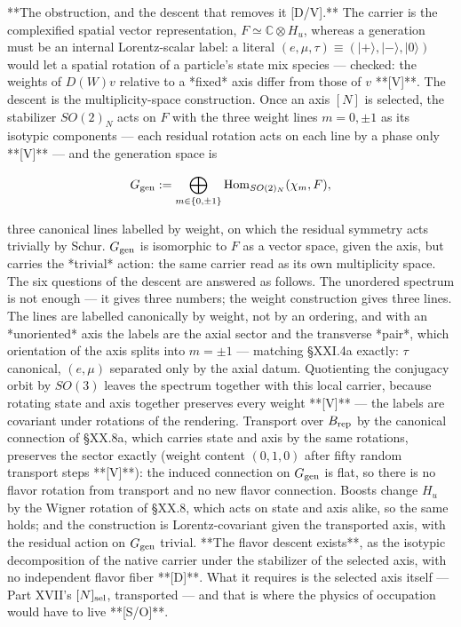 **The obstruction, and the descent that removes it [D/V].** The carrier is the complexified spatial vector representation, $F\simeq\mathbb C\otimes H_u$, whereas a generation must be an internal Lorentz-scalar label: a literal $(e,\mu,\tau)\equiv(|+\rangle,|-\rangle,|0\rangle)$ would let a spatial rotation of a particle's state mix species — checked: the weights of $D(W)v$ relative to a *fixed* axis differ from those of $v$ **[V]**. The descent is the multiplicity-space construction. Once an axis $[N]$ is selected, the stabilizer $SO(2)_N$ acts on $F$ with the three weight lines $m = 0,\pm1$ as its isotypic components — each residual rotation acts on each line by a phase only **[V]** — and the generation space is

$$G_{\rm gen} := \bigoplus_{m\in\{0,\pm1\} }{\rm Hom}_{SO(2)_N}(\chi_m,F),$$

three canonical lines labelled by weight, on which the residual symmetry acts trivially by Schur. $G_{\rm gen}$ is isomorphic to $F$ as a vector space, given the axis, but carries the *trivial* action: the same carrier read as its own multiplicity space. The six questions of the descent are answered as follows. The unordered spectrum is not enough — it gives three numbers; the weight construction gives three lines. The lines are labelled canonically by weight, not by an ordering, and with an *unoriented* axis the labels are the axial sector and the transverse *pair*, which orientation of the axis splits into $m = \pm1$ — matching §XXI.4a exactly: $\tau$ canonical, $(e,\mu)$ separated only by the axial datum. Quotienting the conjugacy orbit by $SO(3)$ leaves the spectrum together with this local carrier, because rotating state and axis together preserves every weight **[V]** — the labels are covariant under rotations of the rendering. Transport over $B_{\rm rep}$ by the canonical connection of §XX.8a, which carries state and axis by the same rotations, preserves the sector exactly (weight content $(0,1,0)$ after fifty random transport steps **[V]**): the induced connection on $G_{\rm gen}$ is flat, so there is no flavor rotation from transport and no new flavor connection. Boosts change $H_u$ by the Wigner rotation of §XX.8, which acts on state and axis alike, so the same holds; and the construction is Lorentz-covariant given the transported axis, with the residual action on $G_{\rm gen}$ trivial. **The flavor descent exists**, as the isotypic decomposition of the native carrier under the stabilizer of the selected axis, with no independent flavor fiber **[D]**. What it requires is the selected axis itself — Part XVII's $[N]_{\rm sel}$, transported — and that is where the physics of occupation would have to live **[S/O]**.

